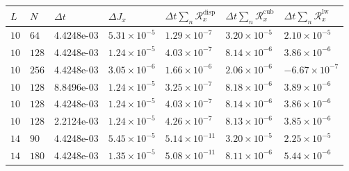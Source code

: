 \begin{tabular}{lllllll}
\toprule
$L$ & $N$ & $\Delta t$ & $\Delta J_x$ & $\Delta t\sum_n\mathcal{R}^{\mathrm{disp}}_x$ & $\Delta t\sum_n\mathcal{R}^{\mathrm{cub}}_x$ & $\Delta t\sum_n\mathcal{R}^{\mathrm{lw}}_x$ \\
\midrule
\(10\) & \(64\) & 4.4248e-03 & \(5.31\times10^{-5}\) & \(1.29\times10^{-7}\) & \(3.20\times10^{-5}\) & \(2.10\times10^{-5}\) \\
\(10\) & \(128\) & 4.4248e-03 & \(1.24\times10^{-5}\) & \(4.03\times10^{-7}\) & \(8.14\times10^{-6}\) & \(3.86\times10^{-6}\) \\
\(10\) & \(256\) & 4.4248e-03 & \(3.05\times10^{-6}\) & \(1.66\times10^{-6}\) & \(2.06\times10^{-6}\) & \(-6.67\times10^{-7}\) \\
\midrule
\(10\) & \(128\) & 8.8496e-03 & \(1.24\times10^{-5}\) & \(3.25\times10^{-7}\) & \(8.18\times10^{-6}\) & \(3.89\times10^{-6}\) \\
\(10\) & \(128\) & 4.4248e-03 & \(1.24\times10^{-5}\) & \(4.03\times10^{-7}\) & \(8.14\times10^{-6}\) & \(3.86\times10^{-6}\) \\
\(10\) & \(128\) & 2.2124e-03 & \(1.24\times10^{-5}\) & \(4.26\times10^{-7}\) & \(8.13\times10^{-6}\) & \(3.85\times10^{-6}\) \\
\midrule
\(14\) & \(90\) & 4.4248e-03 & \(5.45\times10^{-5}\) & \(5.14\times10^{-11}\) & \(3.20\times10^{-5}\) & \(2.25\times10^{-5}\) \\
\(14\) & \(180\) & 4.4248e-03 & \(1.35\times10^{-5}\) & \(5.08\times10^{-11}\) & \(8.11\times10^{-6}\) & \(5.44\times10^{-6}\) \\
\bottomrule
\end{tabular}
